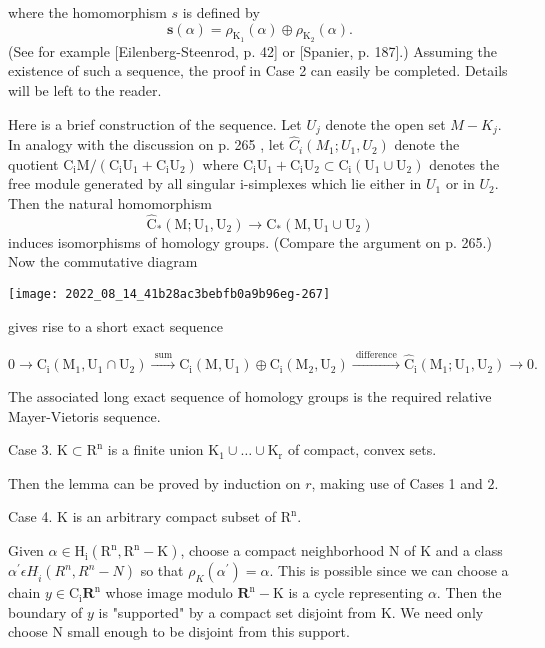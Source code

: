 \documentclass[10pt]{article}
\begin{document}
where the homomorphism $s$ is defined by
$$
\mathbf{s}(\alpha)=\rho_{\mathrm{K}_{1}}(\alpha) \oplus \rho_{\mathrm{K}_{2}}(\alpha) .
$$
(See for example [Eilenberg-Steenrod, p. 42] or [Spanier, p. 187].) Assuming the existence of such a sequence, the proof in Case 2 can easily be completed. Details will be left to the reader.

Here is a brief construction of the sequence. Let $U_{j}$ denote the open set $M-K_{j}$. In analogy with the discussion on p. 265 , let $\widehat{C}_{i}\left(M_{1} ; U_{1}, U_{2}\right)$ denote the quotient $\mathrm{C}_{\mathrm{i}} \mathrm{M} /\left(\mathrm{C}_{\mathrm{i}} \mathrm{U}_{1}+\mathrm{C}_{\mathrm{i}} \mathrm{U}_{2}\right)$ where $\mathrm{C}_{\mathrm{i}} \mathrm{U}_{1}+\mathrm{C}_{\mathrm{i}} \mathrm{U}_{2} \subset \mathrm{C}_{\mathrm{i}}\left(\mathrm{U}_{1} \cup \mathrm{U}_{2}\right)$ denotes the free module generated by all singular i-simplexes which lie either in $U_{1}$ or in $U_{2}$. Then the natural homomorphism
$$
\widehat{\mathrm{C}}_{*}\left(\mathrm{M} ; \mathrm{U}_{1}, \mathrm{U}_{2}\right) \rightarrow \mathrm{C}_{*}\left(\mathrm{M}, \mathrm{U}_{1} \cup \mathrm{U}_{2}\right)
$$
induces isomorphisms of homology groups. (Compare the argument on p. 265.) Now the commutative diagram

\texttt{[image: 2022\_08\_14\_41b28ac3bebfb0a9b96eg-267]}

gives rise to a short exact sequence

$0 \longrightarrow \mathrm{C}_{\mathrm{i}}\left(\mathrm{M}_{1}, \mathrm{U}_{1} \cap \mathrm{U}_{2}\right) \stackrel{\text { sum }}{\longrightarrow} \mathrm{C}_{\mathrm{i}}\left(\mathrm{M}, \mathrm{U}_{1}\right) \oplus \mathrm{C}_{\mathrm{i}}\left(\mathrm{M}_{2}, \mathrm{U}_{2}\right) \stackrel{\text { difference }}{\longrightarrow} \hat{\mathrm{C}}_{\mathrm{i}}\left(\mathrm{M}_{1} ; \mathrm{U}_{1}, \mathrm{U}_{2}\right) \longrightarrow 0 .$

The associated long exact sequence of homology groups is the required relative Mayer-Vietoris sequence.

Case 3. $\mathrm{K} \subset \mathrm{R}^{\mathrm{n}}$ is a finite union $\mathrm{K}_{1} \cup \ldots \cup \mathrm{K}_{\mathrm{r}}$ of compact, convex sets.

Then the lemma can be proved by induction on $r$, making use of Cases 1 and $2 .$

Case 4. $\mathrm{K}$ is an arbitrary compact subset of $\mathrm{R}^{\mathrm{n}}$.

Given $\alpha \in \mathrm{H}_{\mathrm{i}}\left(\mathrm{R}^{\mathrm{n}}, \mathrm{R}^{\mathrm{n}}-\mathrm{K}\right)$, choose a compact neighborhood $\mathrm{N}$ of $\mathrm{K}$ and a class $\alpha^{\prime} \epsilon H_{\dot{i}}\left(R^{n}, R^{n}-N\right)$ so that $\rho_{K}\left(\alpha^{\prime}\right)=\alpha$. This is possible since we can choose a chain $y \in \mathrm{C}_{\mathrm{i}} \mathbf{R}^{\mathrm{n}}$ whose image modulo $\mathbf{R}^{\mathrm{n}}-\mathrm{K}$ is a cycle representing $\alpha$. Then the boundary of $y$ is "supported" by a compact set disjoint from $\mathrm{K}$. We need only choose $\mathrm{N}$ small enough to be disjoint from this support.
\end{document}

